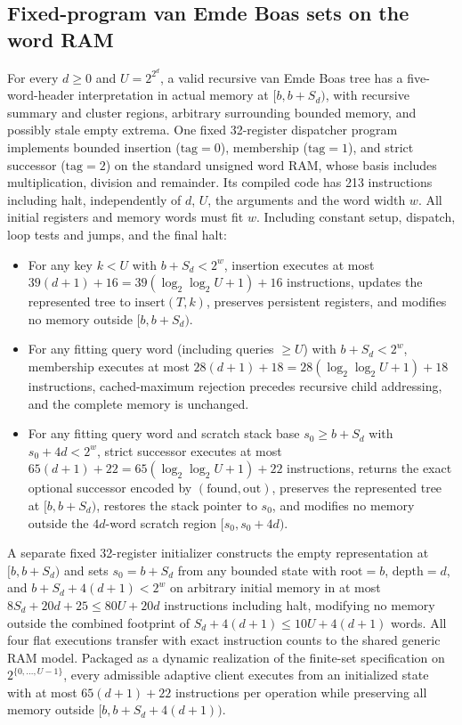 \begin{result}
\subsection{Fixed-program van Emde Boas sets on the word RAM}
For every $d\geq0$ and $U=2^{2^d}$, a valid recursive van Emde Boas tree has a
five-word-header interpretation in actual memory at $[b,b+S_d)$, with recursive summary and
cluster regions, arbitrary surrounding bounded memory, and possibly stale empty extrema. One
fixed 32-register dispatcher program implements bounded insertion ($\mathrm{tag}=0$),
membership ($\mathrm{tag}=1$), and strict successor ($\mathrm{tag}=2$) on the standard
unsigned word RAM, whose basis includes multiplication, division and remainder. Its compiled
code has 213 instructions including halt, independently of $d$, $U$, the arguments and the
word width $w$. All initial registers and memory words must fit $w$. Including constant
setup, dispatch, loop tests and jumps, and the final halt:
\begin{itemize}
\item For any key $k<U$ with $b+S_d<2^w$, insertion executes at most
  $39(d+1)+16=39(\log_2\log_2 U+1)+16$ instructions, updates the represented tree to
  $\mathrm{insert}(T,k)$, preserves persistent registers, and modifies no memory outside
  $[b,b+S_d)$.
\item For any fitting query word (including queries $\geq U$) with $b+S_d<2^w$, membership
  executes at most $28(d+1)+18=28(\log_2\log_2 U+1)+18$ instructions, cached-maximum
  rejection precedes recursive child addressing, and the complete memory is unchanged.
\item For any fitting query word and scratch stack base $s_0\geq b+S_d$ with
  $s_0+4d<2^w$, strict successor executes at most
  $65(d+1)+22=65(\log_2\log_2 U+1)+22$ instructions, returns the exact optional successor
  encoded by $(\mathrm{found},\mathrm{out})$, preserves the represented tree at $[b,b+S_d)$,
  restores the stack pointer to $s_0$, and modifies no memory outside the $4d$-word scratch
  region $[s_0,s_0+4d)$.
\end{itemize}
A separate fixed 32-register initializer constructs the empty representation at $[b,b+S_d)$
and sets $s_0=b+S_d$ from any bounded state with $\mathrm{root}=b$, $\mathrm{depth}=d$, and
$b+S_d+4(d+1)<2^w$ on arbitrary initial memory in at most
$8S_d+20d+25 \leq 80U+20d$ instructions including halt, modifying no memory outside the
combined footprint of $S_d+4(d+1)\leq 10U+4(d+1)$ words. All four flat executions transfer
with exact instruction counts to the shared generic RAM model. Packaged as a dynamic
realization of the finite-set specification on $2^{\{0,\ldots,U-1\}}$, every admissible
adaptive client executes from an initialized state with at most $65(d+1)+22$ instructions per
operation while preserving all memory outside $[b,b+S_d+4(d+1))$.


\end{result}
